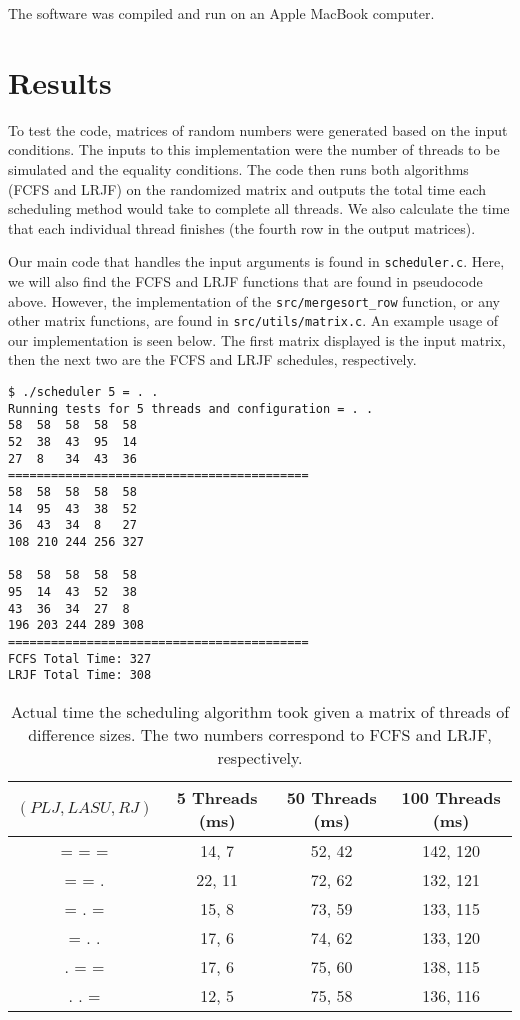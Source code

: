 \documentclass[letterpaper,12pt]{article}
\begin{document}
The software was compiled and run on an Apple MacBook computer.


\section{Results}
To test the code, matrices of random numbers were generated based on the input conditions.
The inputs to this implementation were the number of threads to be simulated and the equality conditions.
The code then runs both algorithms (FCFS and LRJF) on the randomized matrix and outputs the total time each scheduling method would take to complete all threads. 
We also calculate the time that each individual thread finishes (the fourth row in the output matrices). 

Our main code that handles the input arguments is found in \texttt{scheduler.c}.
Here, we will also find the FCFS and LRJF functions that are found in pseudocode above.
However, the implementation of the \texttt{src/mergesort\_row} function, or any other matrix functions, are found in \texttt{src/utils/matrix.c}.
An example usage of our implementation is seen below. 
The first matrix displayed is the input matrix, then the next two are the FCFS and LRJF schedules, respectively.

\begin{verbatim}
$ ./scheduler 5 = . .
Running tests for 5 threads and configuration = . .
58	58	58	58	58	
52	38	43	95	14	
27	8	34	43	36	
==========================================
58	58	58	58	58	
14	95	43	38	52	
36	43	34	8	27	
108	210	244	256	327	

58	58	58	58	58	
95	14	43	52	38	
43	36	34	27	8	
196	203	244	289	308
==========================================
FCFS Total Time: 327
LRJF Total Time: 308
\end{verbatim}

\begin{table}[ht]
\begin{center}
\caption{Actual time the scheduling algorithm took given a matrix of threads of difference sizes. The two numbers correspond to FCFS and LRJF, respectively.}
\begin{tabular}{|c|ccc|} 
\hline
\multicolumn{1}{|c|}{$(PLJ, LASU, RJ)$} &
\multicolumn{1}{c}{5 Threads (ms)} &
\multicolumn{1}{c}{50 Threads (ms)} &
\multicolumn{1}{c|}{100 Threads (ms)} \\
\hline
= = = & 14, 7 & 52, 42 & 142, 120 \\
= = . & 22, 11 & 72, 62 & 132, 121 \\
= . = & 15, 8 & 73, 59 & 133, 115 \\
= . . & 17, 6 & 74, 62 & 133, 120 \\
. = = & 17, 6 & 75, 60 & 138, 115 \\
. . = & 12, 5 & 75, 58 & 136, 116 \\
\hline
\end{tabular}
\end{center}
\end{table}
\end{document}
